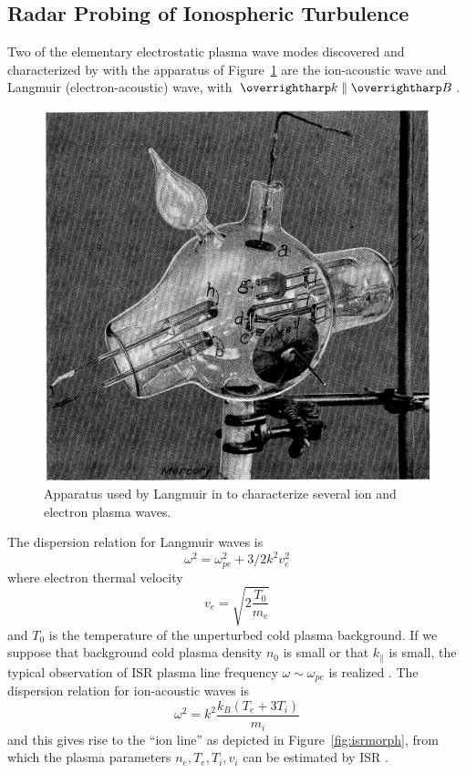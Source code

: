 \subsection{Radar Probing of Ionospheric Turbulence}
Two of the elementary electrostatic plasma wave modes discovered and characterized by \citet{tonks1929} \citep{hershkowitz2009} with the apparatus of Figure~\ref{fig:langmuirtube}  are the ion-acoustic wave and Langmuir (electron-acoustic) wave, with $\vect{k} \parallel \vect{B}$.
\begin{figure}
	\includegraphics[width=\linewidth]{gfx/langmuir-tube}
	\caption{Apparatus used by Langmuir in \citet{tonks1929} to characterize several ion and electron plasma waves.}
	\label{fig:langmuirtube}
\end{figure}
The dispersion relation for Langmuir waves is
\begin{equation}
\omega ^{2} = \omega _{pe}^{2}+3/2 k^{2}v_{e}^{2}
\end{equation}
where electron thermal velocity 
\begin{equation}
v_e = \sqrt{2 \frac{T_0}{m_e}}
\end{equation}
and $T_0$ is the temperature of the unperturbed cold plasma background.
If we suppose that background cold plasma density $n_0$ is small or that $k_\parallel$ is small, the typical observation of ISR plasma line frequency $\omega \sim \omega_{pe}$ is realized \citep{akbaridis}.
The dispersion relation for ion-acoustic waves is
\begin{equation}
\omega ^{2} = k^{2}{\frac{k_B(T_{e} + 3 T_{i})}{m_i}}
\end{equation}
and this gives rise to the ``ion line'' as depicted in Figure~\ref{fig:isrmorph}, from which the plasma parameters $n_e, T_e, T_i, v_i$ can be estimated by ISR \citep{swobodathesis}.

